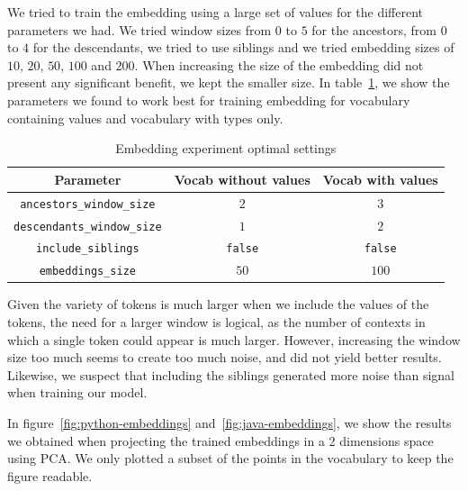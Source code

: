 We tried to train the embedding using a large set of values for the different
parameters we had. We tried window sizes from $0$ to $5$ for the ancestors, from
$0$ to $4$ for the descendants, we tried to use siblings and we tried embedding
sizes of $10$, $20$, $50$, $100$ and $200$. When increasing the size of the
embedding did not present any significant benefit, we kept the smaller size. In
table~\ref{tab:no-value-embedding-params}, we show the parameters we found to
work best for training embedding for vocabulary containing values and vocabulary
with types only.

\begin{table}
  \caption{\label{tab:no-value-embedding-params}Embedding experiment optimal settings}
  \begin{center}
    \begin{tabularx}{\linewidth}{c c c}
      \toprule
      Parameter & Vocab without values & Vocab with values\\
      \toprule
      \lstinline{ancestors_window_size} & $2$ & $3$\\
      \lstinline{descendants_window_size} & $1$ & $2$\\
      \lstinline{include_siblings} & \lstinline{false} & \lstinline{false}\\
      \lstinline{embeddings_size} & $50$ & $100$\\
      \bottomrule
    \end{tabularx}
  \end{center}
\end{table}

Given the variety of tokens is much larger when we include the values of the
tokens, the need for a larger window is logical, as the number of contexts in
which a single token could appear is much larger. However, increasing the window
size too much seems to create too much noise, and did not yield better results.
Likewise, we suspect that including the siblings generated more noise than
signal when training our model.

In figure~\ref{fig:python-embeddings} and~\ref{fig:java-embeddings}, we show the
results we obtained when projecting the trained embeddings in a 2 dimensions
space using PCA\cite{DBLP:journals/corr/Shlens14}. We only plotted a subset of
the points in the vocabulary to keep the figure readable.

